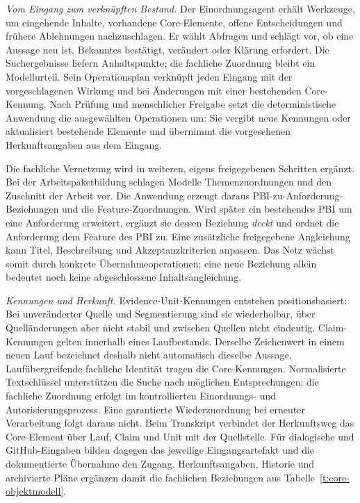 \begin{samepage}
\emph{Vom Eingang zum verknüpften Bestand.} Der Einordnungsagent
erhält Werkzeuge, um eingehende Inhalte, vorhandene Core-Elemente,
offene Entscheidungen und frühere Ablehnungen nachzuschlagen.
Er wählt Abfragen und schlägt vor, ob eine Aussage neu ist,
Bekanntes bestätigt, verändert oder Klärung erfordert. Die
Suchergebnisse liefern Anhaltspunkte; die fachliche Zuordnung bleibt
ein Modellurteil. Sein Operationsplan verknüpft jeden Eingang mit
der vorgeschlagenen Wirkung und bei Änderungen mit einer bestehenden
Core-Kennung. Nach Prüfung und menschlicher Freigabe setzt die
deterministische Anwendung die ausgewählten Operationen um: Sie
vergibt neue Kennungen oder aktualisiert bestehende Elemente und
übernimmt die vorgesehenen Herkunftsangaben aus dem Eingang.
\par
\end{samepage}

Die fachliche Vernetzung wird in weiteren, eigens freigegebenen
Schritten ergänzt. Bei der Arbeitspaketbildung schlagen Modelle
Themenzuordnungen und den Zuschnitt der Arbeit vor. Die Anwendung
erzeugt daraus PBI-zu-Anforderung-Beziehungen und die
Feature-Zuordnungen. Wird später ein bestehendes PBI um eine
Anforderung erweitert, ergänzt sie dessen Beziehung \emph{deckt}
und ordnet die Anforderung dem Feature des PBI zu. Eine zusätzliche
freigegebene Angleichung kann Titel, Beschreibung und
Akzeptanzkriterien anpassen. Das Netz wächst somit durch konkrete
Übernahmeoperationen; eine neue Beziehung allein bedeutet noch
keine abgeschlossene Inhaltsangleichung.

\emph{Kennungen und Herkunft.} Evidence-Unit-Kennungen entstehen
positionsbasiert: Bei unveränderter Quelle und Segmentierung sind
sie wiederholbar, über Quelländerungen aber nicht stabil und zwischen
Quellen nicht eindeutig. Claim-Kennungen gelten innerhalb eines
Laufbestands. Derselbe Zeichenwert in einem neuen Lauf bezeichnet
deshalb nicht automatisch dieselbe Aussage. Laufübergreifende
fachliche Identität tragen die Core-Kennungen. Normalisierte
Textschlüssel unterstützen die Suche nach möglichen Entsprechungen;
die fachliche Zuordnung erfolgt im kontrollierten Einordnungs- und
Autorisierungsprozess. Eine garantierte Wiederzuordnung bei erneuter
Verarbeitung folgt daraus nicht. Beim Transkript verbindet der
Herkunftsweg das Core-Element über Lauf, Claim und Unit mit der
Quellstelle. Für dialogische und GitHub-Eingaben bilden dagegen
das jeweilige Eingangsartefakt und die dokumentierte Übernahme den
Zugang. Herkunftsangaben, Historie und archivierte Pläne ergänzen
damit die fachlichen Beziehungen aus Tabelle~\ref{t:core-objektmodell}.

